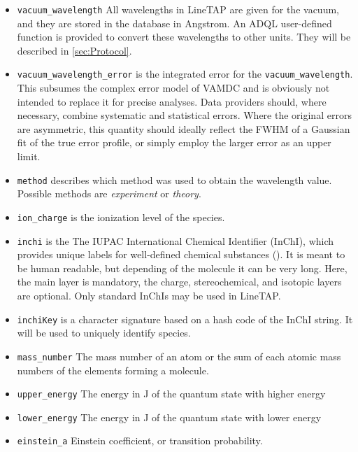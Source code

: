 \documentclass[11pt,a4paper]{ivoa}
\begin{document}
\begin{itemize}
\item \texttt{vacuum\_wavelength}
All wavelengths in LineTAP are given for the vacuum,
and  they are stored in the database in
Angstrom.  An  ADQL user-defined function is provided to convert these
wavelengths to other units. They will be described in
\ref{sec:Protocol}.

\item \texttt{vacuum\_wavelength\_error} is the integrated error for the 
\texttt{vacuum\_wavelength}.  This subsumes the complex error model of
VAMDC and is obviously not intended to replace it for precise analyses.
Data providers should, where necessary, combine systematic and
statistical errors.  Where the original errors are asymmetric, this
quantity should ideally reflect the FWHM of a Gaussian fit of the true
error profile, or simply employ the larger error as an upper limit.

\item \texttt{method} describes which method was used to obtain the
wavelength value. Possible methods are \textit{experiment} or \textit{theory}.

\item \texttt{ion\_charge} is the ionization level of the species.

\item \texttt{inchi} is the The IUPAC International Chemical Identifier
(InChI), which  provides unique labels for well-defined chemical
substances (\cite{INCHI}). It is meant to be human readable, but
depending of the molecule it can be very long.  Here, the main layer is
mandatory, the charge, stereochemical, and isotopic layers are optional.
Only standard InChIs may be used in LineTAP.

\item \texttt{inchiKey} is a character signature based on a hash code of
the InChI string. It will be used to uniquely identify species.

\item \texttt{mass\_number} The mass number of an atom or the sum of
each atomic mass numbers of the elements forming a molecule.

\item \texttt{upper\_energy} The energy  in J of the quantum state
with higher energy
\item \texttt{lower\_energy} The energy  in J of the quantum state
with lower energy

\item \texttt{einstein\_a} Einstein coefficient, or transition probability.


\end{itemize}
\end{document}
